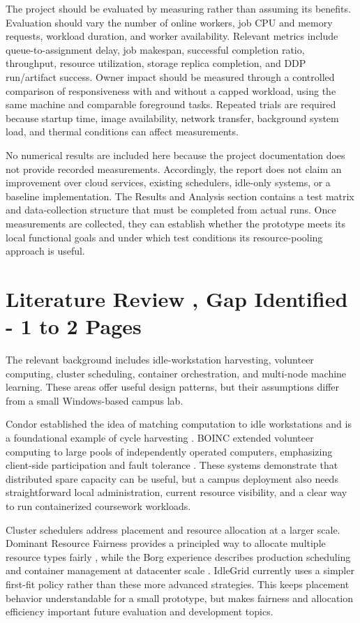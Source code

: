 \documentclass{article}
\begin{document}
The project should be evaluated by measuring rather than assuming its benefits. Evaluation should vary the number of online workers, job CPU and memory requests, workload duration, and worker availability. Relevant metrics include queue-to-assignment delay, job makespan, successful completion ratio, throughput, resource utilization, storage replica completion, and DDP run/artifact success. Owner impact should be measured through a controlled comparison of responsiveness with and without a capped workload, using the same machine and comparable foreground tasks. Repeated trials are required because startup time, image availability, network transfer, background system load, and thermal conditions can affect measurements.

No numerical results are included here because the project documentation does not provide recorded measurements. Accordingly, the report does not claim an improvement over cloud services, existing schedulers, idle-only systems, or a baseline implementation. The Results and Analysis section contains a test matrix and data-collection structure that must be completed from actual runs. Once measurements are collected, they can establish whether the prototype meets its local functional goals and under which test conditions its resource-pooling approach is useful.

	\pagebreak
    
	\section{Literature Review , Gap Identified - 1 to 2 Pages}
The relevant background includes idle-workstation harvesting, volunteer computing, cluster scheduling, container orchestration, and multi-node machine learning. These areas offer useful design patterns, but their assumptions differ from a small Windows-based campus lab.

Condor established the idea of matching computation to idle workstations and is a foundational example of cycle harvesting \cite{condor}. BOINC extended volunteer computing to large pools of independently operated computers, emphasizing client-side participation and fault tolerance \cite{boinc}. These systems demonstrate that distributed spare capacity can be useful, but a campus deployment also needs straightforward local administration, current resource visibility, and a clear way to run containerized coursework workloads.

Cluster schedulers address placement and resource allocation at a larger scale. Dominant Resource Fairness provides a principled way to allocate multiple resource types fairly \cite{drf}, while the Borg experience describes production scheduling and container management at datacenter scale \cite{borg}. IdleGrid currently uses a simpler first-fit policy rather than these more advanced strategies. This keeps placement behavior understandable for a small prototype, but makes fairness and allocation efficiency important future evaluation and development topics.
\end{document}
